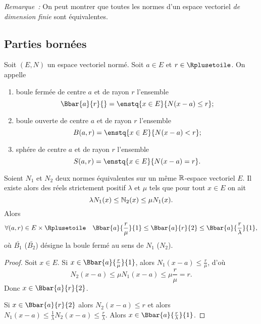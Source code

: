 \emph{Remarque~:} On peut montrer que toutes les normes d'un espace vectoriel \emph{de dimension finie} sont équivalentes.

\subsection{Parties bornées}

\begin{defdef}
  Soit $(E, N)$ un espace vectoriel normé. Soit $a \in E$ et $r \in \Rplusetoile$. On appelle
  \begin{enumerate}
  \item boule fermée de centre $a$ et de rayon $r$ l'ensemble
    \begin{equation}
      \Bbar{a}{r}{} = \enstq{x\in E}{N(x-a) \leq r};
    \end{equation}
  \item boule ouverte de centre $a$ et de rayon $r$ l'ensemble
    \begin{equation}
      B(a, r) = \enstq{x\in E}{N(x-a) < r};
    \end{equation}
  \item sphére de centre $a$ et de rayon $r$ l'ensemble
    \begin{equation}
      S(a, r) = \enstq{x\in E}{N(x-a) = r}.
    \end{equation}    
  \end{enumerate}
\end{defdef}
%
\begin{theo}
  Soient $N_1$ et $N_2$ deux normes équivalentes sur un même $\mathbb{R}$-espace vectoriel $E$. Il existe alors des réels strictement positif $\lambda$ et $\mu$ tels que pour tout $x \in E$ on ait
  \begin{equation}
    \lambda N_1(x) \leq \mathbb{N}_2(x) \leq \mu N_1(x).
  \end{equation}
  Alors
  \begin{equation}
    \forall (a, r) \in E \times \Rplusetoile \quad \Bbar{a}{\frac{r}{\mu}}{1} \leq \Bbar{a}{r}{2} \leq \Bbar{a}{\frac{r}{\lambda}}{1},
  \end{equation}
  où $\bar{B_1}$ ($\bar{B_2}$) désigne la boule fermé au sens de $N_1$ ($N_2$).
\end{theo}
\begin{proof}
  Soit $x \in E$. Si $x \in \Bbar{a}{\frac{r}{\mu}}{1}$, alors $N_1(x-a) \leq \frac{r}{\mu}$, d'où
  \begin{equation}
    N_2(x-a) \leq \mu N_1(x-a) \leq \mu \frac{r}{\mu}=r.
  \end{equation}
  Donc $x \in \Bbar{a}{r}{2}$.

  Si $x \in \Bbar{a}{r}{2}$ alors $N_2(x-a) \leq r$ et alors $N_1(x-a) \leq \frac{1}{\lambda} N_2(x-a) \leq \frac{r}{\lambda}$. Alors $x \in \Bbar{a}{\frac{r}{\lambda}}{1}$.
\end{proof}

